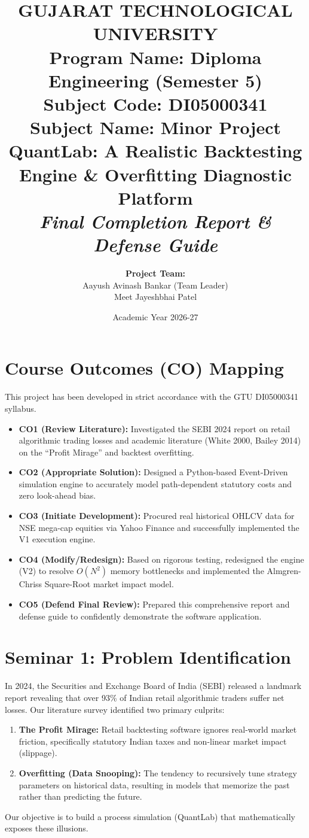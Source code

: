 \documentclass[12pt,a4paper]{article}
\title{
    \vspace{1cm}
    \textbf{\Large GUJARAT TECHNOLOGICAL UNIVERSITY} \\
    \vspace{0.5cm}
    \textbf{Program Name: Diploma Engineering (Semester 5)} \\
    \textbf{Subject Code: DI05000341} \\
    \textbf{Subject Name: Minor Project} \\
    \vspace{1.5cm}
    \textbf{\huge QuantLab: A Realistic Backtesting Engine \& Overfitting Diagnostic Platform} \\
    \vspace{1cm}
    \textit{Final Completion Report \& Defense Guide}
}
\author{
    \textbf{Project Team:} \\
    Aayush Avinash Bankar (Team Leader) \\
    Meet Jayeshbhai Patel
}
\date{Academic Year 2026-27}
\begin{document}
\maketitle
\newpage

\tableofcontents
\newpage

\section{Course Outcomes (CO) Mapping}
This project has been developed in strict accordance with the GTU DI05000341 syllabus.
\begin{itemize}
    \item \textbf{CO1 (Review Literature):} Investigated the SEBI 2024 report on retail algorithmic trading losses and academic literature (White 2000, Bailey 2014) on the ``Profit Mirage'' and backtest overfitting.
    \item \textbf{CO2 (Appropriate Solution):} Designed a Python-based Event-Driven simulation engine to accurately model path-dependent statutory costs and zero look-ahead bias.
    \item \textbf{CO3 (Initiate Development):} Procured real historical OHLCV data for NSE mega-cap equities via Yahoo Finance and successfully implemented the V1 execution engine.
    \item \textbf{CO4 (Modify/Redesign):} Based on rigorous testing, redesigned the engine (V2) to resolve $O(N^2)$ memory bottlenecks and implemented the Almgren-Chriss Square-Root market impact model.
    \item \textbf{CO5 (Defend Final Review):} Prepared this comprehensive report and defense guide to confidently demonstrate the software application.
\end{itemize}

\section{Seminar 1: Problem Identification}
In 2024, the Securities and Exchange Board of India (SEBI) released a landmark report revealing that over 93\% of Indian retail algorithmic traders suffer net losses. Our literature survey identified two primary culprits:
\begin{enumerate}
    \item \textbf{The Profit Mirage:} Retail backtesting software ignores real-world market friction, specifically statutory Indian taxes and non-linear market impact (slippage).
    \item \textbf{Overfitting (Data Snooping):} The tendency to recursively tune strategy parameters on historical data, resulting in models that memorize the past rather than predicting the future.
\end{enumerate}
Our objective is to build a process simulation (QuantLab) that mathematically exposes these illusions.
\end{document}
